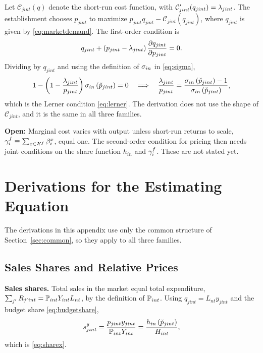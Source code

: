 Let $\mathcal{C}_{jint}(q)$ denote the short-run cost function, with $\mathcal{C}_{jint}'(q_{jint}) = \l_{jint}$.
The establishment chooses $p_{jint}$ to maximize $p_{jint} q_{jint} - \mathcal{C}_{jint}(q_{jint})$, where $q_{jint}$ is given by \eqref{eq:marketdemand}.
The first-order condition is
\begin{equation*}
	q_{jint} + \left(p_{jint} - \l_{jint}\right) \frac{\partial q_{jint}}{\partial p_{jint}} = 0.
\end{equation*}
Dividing by $q_{jint}$ and using the definition of $\s_{in}$ in \eqref{eq:sigma},
\begin{equation*}
	1 - \left(1 - \frac{\l_{jint}}{p_{jint}}\right) \s_{in}\left(\check{p}_{jint}\right) = 0
	\quad \Longrightarrow \quad
	\frac{\l_{jint}}{p_{jint}} = \frac{\s_{in}\left(\check{p}_{jint}\right) - 1}{\s_{in}\left(\check{p}_{jint}\right)},
\end{equation*}
which is the Lerner condition \eqref{eq:lerner}.
The derivation does not use the shape of $\mathcal{C}_{jint}$, and it is the same in all three families.

\textbf{Open:} Marginal cost varies with output unless short-run returns to scale, $\g^f_i \equiv \sum_{x \in \cX^f} \b^x_i$, equal one.
The second-order condition for pricing then needs joint conditions on the share function $h_{in}$ and $\g^f_i$.
These are not stated yet.



\section{Derivations for the Estimating Equation}\label{sec:app-estimation}

The derivations in this appendix use only the common structure of Section~\ref{sec:common}, so they apply to all three families.

\subsection{Sales Shares and Relative Prices}\label{sec:app-shares}

\textbf{Sales shares.}
Total sales in the market equal total expenditure, $\sum_{j'} R_{j'int} = \P_{int} Y_{int} L_{nt}$, by the definition of $\P_{int}$.
Using $q_{jint} = L_{nt} y_{jint}$ and the budget share \eqref{eq:budgetshare},
\begin{equation*}
	s^y_{jint} = \frac{p_{jint} y_{jint}}{\P_{int} Y_{int}} = \frac{h_{in}\left(\check{p}_{jint}\right)}{H_{int}},
\end{equation*}
which is \eqref{eq:sharex}.

